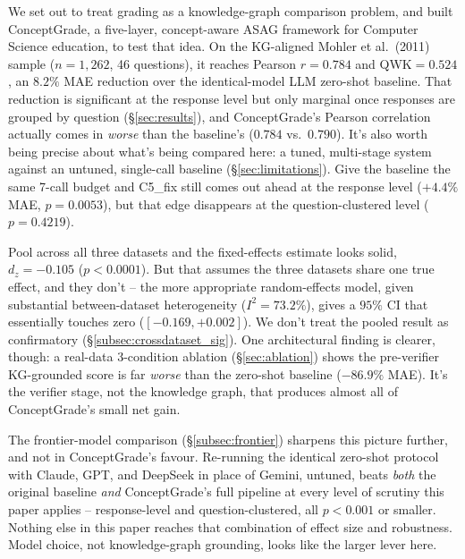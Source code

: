 \documentclass[conference]{IEEEtran}
\begin{document}
We set out to treat grading as a knowledge-graph comparison problem,
and built ConceptGrade, a five-layer, concept-aware ASAG framework for
Computer Science education, to test that idea. On the KG-aligned
Mohler et al.\ (2011) sample ($n=1{,}262$, 46 questions), it reaches
Pearson $r=0.784$ and QWK$=0.524$, an $8.2\%$ MAE reduction over the
identical-model LLM
zero-shot baseline. That reduction is significant at the response
level but only marginal once responses are grouped by question
(\S\ref{sec:results}), and ConceptGrade's Pearson correlation actually
comes in \emph{worse} than the baseline's ($0.784$ vs.\ $0.790$). It's
also worth being precise about what's being compared here: a tuned,
multi-stage system against an untuned, single-call baseline
(\S\ref{sec:limitations}). Give the baseline the same 7-call budget
and C5\_fix still comes out ahead at the response level ($+4.4\%$ MAE,
$p=0.0053$), but that edge disappears at the question-clustered level
($p=0.4219$).

Pool across all three datasets and the fixed-effects estimate looks
solid, $d_z=-0.105$ ($p<0.0001$). But that assumes the three datasets
share one true effect, and they don't -- the more appropriate
random-effects model, given substantial between-dataset heterogeneity
($I^2=73.2\%$), gives a $95\%$ CI that essentially touches zero
($[-0.169, +0.002]$). We don't treat the pooled result as confirmatory
(\S\ref{subsec:crossdataset_sig}). One architectural finding is
clearer, though: a real-data 3-condition ablation (\S\ref{sec:ablation})
shows the pre-verifier KG-grounded score is far \emph{worse} than the
zero-shot baseline ($-86.9\%$ MAE). It's the verifier stage, not the
knowledge graph, that produces almost all of ConceptGrade's small net
gain.

The frontier-model comparison (\S\ref{subsec:frontier}) sharpens this
picture further, and not in ConceptGrade's favour. Re-running the
identical zero-shot protocol with Claude, GPT, and DeepSeek in place
of Gemini, untuned, beats \emph{both} the original baseline \emph{and}
ConceptGrade's full pipeline at every level of scrutiny this paper
applies -- response-level and question-clustered, all $p<0.001$ or
smaller. Nothing else in this paper reaches that combination of effect
size and robustness. Model choice, not knowledge-graph grounding,
looks like the larger lever here.
\end{document}
